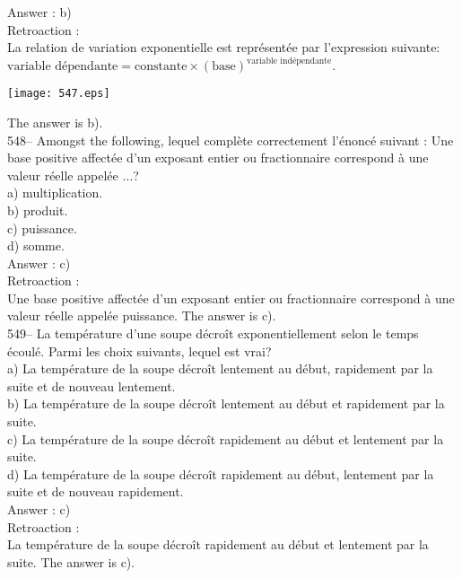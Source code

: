 ﻿\documentclass[letterpaper, 12pt]{article}
\begin{document}
Answer : b)\\

Retroaction : \\
La relation de variation exponentielle est repr\'esent\'ee par l'expression
suivante:\\[2mm]
$\textrm{variable
d\'ependante}=\textrm{constante}\times\left(\textrm{base}\right)
^{\textrm{variable ind\'ependante}}.$\\[2mm]
   \begin{center}
    \texttt{[image: 547.eps]}
    \end{center}
The answer is b).\\

548-- Amongst the following, lequel compl\`ete
correctement l'\'enonc\'e suivant : \og Une base positive affect\'ee
d'un exposant entier ou fractionnaire correspond \`a une valeur r\'eelle appel\'ee $\ldots$\fg ?\\
a) multiplication.\\
b) produit.\\
c) puissance.\\
d) somme.\\

Answer : c)\\

Retroaction : \\
Une base positive affect\'ee d'un exposant entier ou fractionnaire
correspond \`a une valeur r\'eelle appel\'ee puissance.  The answer is
c).\\

549-- La temp\'erature d'une soupe d\'ecro\^it  exponentiellement selon le
temps \'ecoul\'e.  Parmi les choix suivants, lequel est vrai?\\
a) La temp\'erature de la soupe d\'ecro\^it lentement au d\'ebut, rapidement
par la suite et de nouveau lentement.\\
b) La temp\'erature de la soupe d\'ecro\^it lentement au d\'ebut et
rapidement par la suite.\\
c) La temp\'erature de la soupe d\'ecro\^it rapidement au d\'ebut et
lentement par la suite.  \\
d) La temp\'erature de la soupe d\'ecro\^it rapidement au d\'ebut, lentement
par la suite et de nouveau rapidement.\\

Answer : c)\\

Retroaction : \\
La temp\'erature de la soupe d\'ecro\^it rapidement au d\'ebut et lentement
par la suite.  The answer is c).\\
\end{document}
